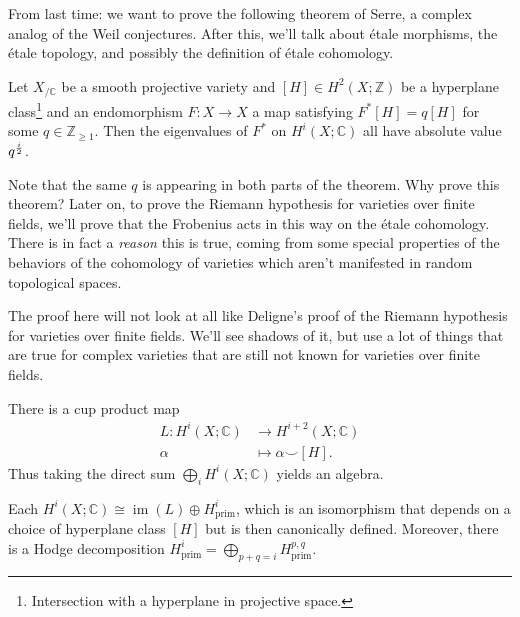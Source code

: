 From last time: we want to prove the following theorem of Serre, a
complex analog of the Weil conjectures. After this, we'll talk about
étale morphisms, the étale topology, and possibly the definition of
étale cohomology.

\begin{theorem}[Serre]

Let \(X_{/{\mathbb{C}}}\) be a smooth projective variety and
\([H]\in H^2(X; {\mathbb{Z}})\) be a hyperplane class\footnote{Intersection
  with a hyperplane in projective space.} and an endomorphism
\(F:X\to X\) a map satisfying \(F^*[H] = q[H]\) for some
\(q\in {\mathbb{Z}}_{\geq 1}\). Then the eigenvalues of \(F^*\) on
\(H^i(X;{\mathbb{C}})\) all have absolute value \(q^{i\over 2}\).

\end{theorem}

Note that the same \(q\) is appearing in both parts of the theorem. Why
prove this theorem? Later on, to prove the Riemann hypothesis for
varieties over finite fields, we'll prove that the Frobenius acts in
this way on the étale cohomology. There is in fact a \emph{reason} this
is true, coming from some special properties of the behaviors of the
cohomology of varieties which aren't manifested in random topological
spaces.

\begin{warnings}

The proof here will not look at all like Deligne's proof of the Riemann
hypothesis for varieties over finite fields. We'll see shadows of it,
but use a lot of things that are true for complex varieties that are
still not known for varieties over finite fields.

\end{warnings}

\begin{fact}

There is a cup product map
\begin{align*}  
L: H^i(X; {\mathbb{C}}) &\to H^{i+2}(X; {\mathbb{C}}) \\
\alpha &\mapsto \alpha \smile [H]
.\end{align*}
Thus taking the direct sum \(\bigoplus_i H^i(X; {\mathbb{C}})\) yields
an algebra.

\end{fact}

\begin{theorem}

Each
\(H^i(X; {\mathbb{C}}) \cong \operatorname{im}(L) \oplus H^i_{\text{prim}}\),
which is an isomorphism that depends on a choice of hyperplane class
\([H]\) but is then canonically defined. Moreover, there is a Hodge
decomposition
\(H^i_{\text{prim}} = \bigoplus_{p+q=i}H^{p, q}_{\text{prim}}\).

\end{theorem}

